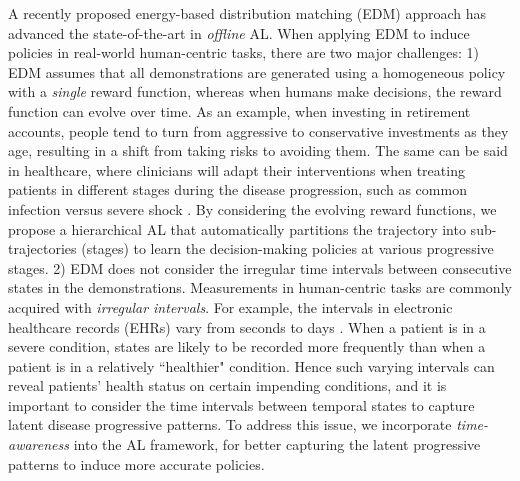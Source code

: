\documentclass{article}
\begin{document}
A recently proposed energy-based distribution matching (EDM) approach \cite{jarrett2020strictly} has advanced the state-of-the-art in \emph{offline} AL. When applying EDM to induce policies in real-world human-centric tasks, there are two major challenges:
1)  EDM assumes that all demonstrations are generated using a homogeneous policy with a \emph{single} reward function, whereas when humans make decisions, the reward function can evolve over time. As an example, when investing in retirement accounts, people tend to turn from aggressive to conservative investments as they age, resulting in a shift from taking risks to avoiding them. The same can be said in healthcare, where clinicians will adapt their interventions when treating patients in different stages during the disease progression, such as common infection versus severe shock \cite{wang2022hierarchical}. By considering the evolving reward functions, we propose a hierarchical AL that automatically partitions the trajectory into sub-trajectories (stages) to learn the decision-making policies at various progressive stages. 
2) EDM does not consider the irregular time intervals between consecutive states in the demonstrations. Measurements in human-centric tasks are commonly acquired with \emph{irregular intervals}. For example, the intervals in electronic healthcare records (EHRs) vary from seconds to days \cite{baytas2017patient}. When a patient is in a severe condition, states are likely to be recorded more frequently than when a patient is in a relatively ``healthier" condition. Hence such varying intervals can reveal patients' health status on certain impending conditions, and it is important to consider the time intervals between temporal states to capture latent disease progressive patterns. To address this issue, we incorporate \emph{time-awareness} into the AL framework, for better capturing the latent progressive patterns to induce more accurate policies.
\end{document}
